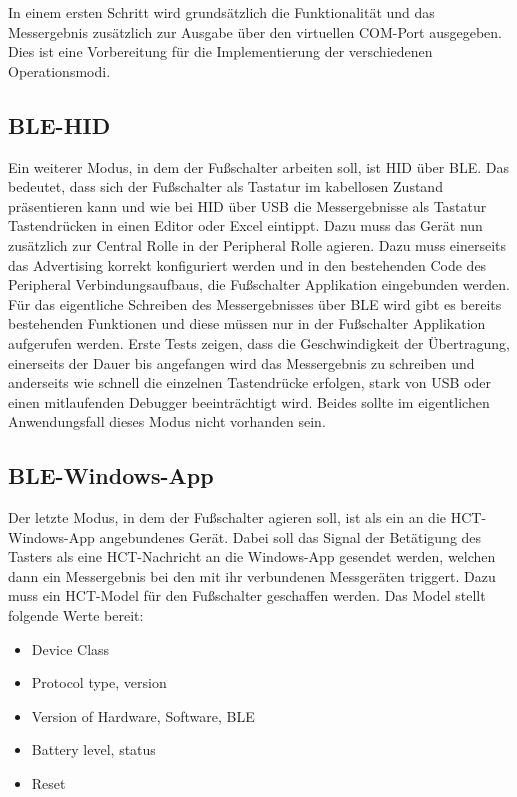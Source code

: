 In einem ersten Schritt wird grundsätzlich die Funktionalität und das Messergebnis zusätzlich zur Ausgabe über den virtuellen COM-Port ausgegeben. Dies ist eine Vorbereitung für die Implementierung der verschiedenen Operationsmodi. 

\subsection{BLE-HID}
Ein weiterer Modus, in dem der Fußschalter arbeiten soll, ist HID über BLE. Das bedeutet, dass sich der Fußschalter als Tastatur im kabellosen Zustand präsentieren kann und wie bei HID über USB die Messergebnisse als Tastatur Tastendrücken in einen Editor oder Excel eintippt. Dazu muss das Gerät nun zusätzlich zur Central Rolle in der Peripheral Rolle agieren. Dazu muss einerseits das Advertising korrekt konfiguriert werden und in den bestehenden Code des Peripheral Verbindungsaufbaus, die Fußschalter Applikation eingebunden werden. Für das eigentliche Schreiben des Messergebnisses über BLE wird gibt es bereits bestehenden Funktionen und diese müssen nur in der Fußschalter Applikation aufgerufen werden. Erste Tests zeigen, dass die Geschwindigkeit der Übertragung, einerseits der Dauer bis angefangen wird das Messergebnis zu schreiben und anderseits wie schnell die einzelnen Tastendrücke erfolgen, stark von USB oder einen mitlaufenden Debugger beeinträchtigt wird. Beides sollte im eigentlichen Anwendungsfall dieses Modus nicht vorhanden sein. 

\subsection{BLE-Windows-App}
Der letzte Modus, in dem der Fußschalter agieren soll, ist als ein an die HCT-Windows-App angebundenes Gerät. Dabei soll das Signal der Betätigung des Tasters als eine HCT-Nachricht an die Windows-App gesendet werden, welchen dann ein Messergebnis bei den mit ihr verbundenen Messgeräten triggert. Dazu muss ein HCT-Model für den Fußschalter geschaffen werden. Das Model stellt folgende Werte bereit:
\begin{itemize}
	\item Device Class
	\item Protocol type, version 
	\item Version of Hardware, Software, BLE
	\item Battery level, status
	\item Reset 
\end{itemize}

